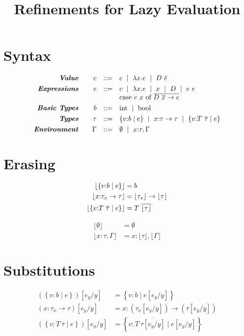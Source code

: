 \documentclass[10pt,a4paper]{article}
\title{Refinements for Lazy Evaluation}
\newcommand\efun[2]{\ensuremath{\lambda #1 . #2}}
\newcommand\eapp[2]{\ensuremath{#1 \ #2}}
\newcommand\edata[2]{\ensuremath{#1 \ #2}}
\newcommand\ecase[5]{\ensuremath{\text{case}\ #1\ #2\ \text{of}\ \overline{\edata{#3}{#4} \rightarrow #5}}}
\newcommand\tint{\ensuremath{\text{int}}}
\newcommand\tbool{\ensuremath{\text{bool}}}
\newcommand\tref[3]{\ensuremath{\left\lbrace {#1} \colon {#2} \mid {#3} \right\rbrace}}
\newcommand\tconref[4]{\tref{#3}{\tcon{#1}{#2}}{#4}}
\newcommand\tcon[2]{\ensuremath{#1\ #2}}
\newcommand\tfun[3]{\ensuremath{#1\colon #2 \rightarrow #3}}
\newcommand\sub[2]{\ensuremath{\left[ #2 / #1 \right]}}
\newcommand\erase[1]{\ensuremath{\lfloor #1 \rfloor}}
\begin{document}
\section*{Syntax}
$$
\begin{array}{rrcl}
\emphbf{Value} \quad 
  & v
  & ::= 
  &   	 c 
  \spmid \efun{x}{e} 
  \spmid \edata{D}{\overline{e}}
  \\[0.05in] 


\emphbf{Expressions} \quad 
  & e
  & ::= 
  &   	 c 
  \spmid \efun{x}{e} 
  \spmid x 
  \spmid D 
  \spmid \eapp{e}{e}  
  \\ &&& \ecase{e}{x}{D}{\overline{x}}{e}
  \\[0.05in] 

\emphbf{Basic Types} \quad 
  & b
  & ::=  
  & 	\tint \spmid \tbool
  \\[0.05in] 

\emphbf{Types} \quad 
  & \tau
  & ::=  
  & 	\tref{v}{b}{e}
  \spmid \tfun{x}{\tau}{\tau}    
  \spmid \tconref{T}{\overline{\tau}}{v}{e}    
  \\[0.05in] 

\emphbf{Environment} \quad 
  & \Gamma
  & ::= 
  &     \emptyset \spmid x\colon \tau, \Gamma

\end{array}
$$



\section*{Erasing}
\begin{align*}
\erase{\tref{v}{b}{e}}&=b\\
\erase{\tfun{x}{\tau_x}{\tau}}&= \erase{\tau_x} \rightarrow \erase{\tau}\\
\erase{\tconref{T}{\overline{\tau}}{v}{e}}&= \tcon{T}\overline{\erase{\tau}}
\end{align*}

\begin{align*}
\erase{\emptyset}&=\emptyset\\
\erase{x\colon\tau, \Gamma}&= x\colon\erase{\tau},\erase{\Gamma}
\end{align*}

\section*{Substitutions}
\begin{align*}
(\tref{v}{b}{e})\sub{y}{e_y} &=\tref{v}{b}{e\sub{y}{e_y}}\\
(\tfun{x}{\tau_x}{\tau})\sub{y}{e_y} &=\tfun{x}{(\tau_x\sub{y}{e_y})}{(\tau\sub{y}{e_y})}\\
(\tconref{T}{\overline{\tau}}{v}{e})\sub{y}{e_y} 
	&=\tconref{T}{\overline{\tau\sub{y}{e_y}}}{v}{e\sub{y}{e_y}}
\end{align*}
\end{document}
